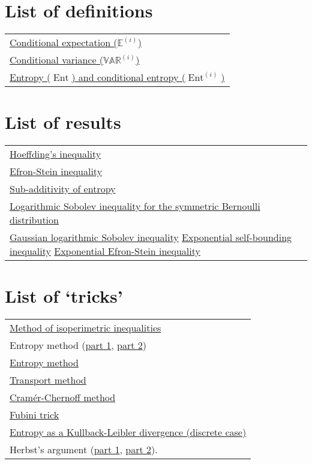 \documentclass[reqno]{amsproc}
\newcommand{\E}{\mathbb{E}} %
\newcommand{\var}{\mathbb{VAR}} %
\DeclareMathOperator{\Ent}{Ent} %
\begin{document}

\appendix
\newpage


\section*{List of definitions}
	\begin{tabular}{l}
		\hyperref[thm:ESI]{Conditional expectation ($\E^{(i)}$)}\\
		\hyperref[thm:ESI]{Conditional variance ($\var^{(i)}$)}\\
		\hyperref[thm:sub_add_entropy]{Entropy ($\Ent$) and conditional entropy ($\Ent^{(i)}$)}
	\end{tabular}
\section*{List of results}
	\begin{tabular}{l}
		\hyperref[thm:hoeffding]{Hoeffding's inequality}\\
		\hyperref[thm:ESI]{Efron-Stein inequality}\\
		\hyperref[thm:sub_add_entropy]{Sub-additivity of entropy}\\
		\hyperref[thm:log_Sob_ineq_sym_Bernoulli]{Logarithmic Sobolev inequality for the symmetric Bernoulli distribution}\\
		\hyperref[thm:Gaussian_log_Sob_ineq]{Gaussian logarithmic Sobolev inequality}
		\hyperref[thm:sub_add_entropy]{Exponential self-bounding inequality}
		\hyperref[thm:exp_efron_stein]{Exponential Efron-Stein inequality}
	\end{tabular}
\section*{List of `tricks'}
	\begin{tabular}{l}
		\hyperref[sec:method_of_isoperimetric_inequalities]{Method of isoperimetric inequalities}\\
		Entropy method (\hyperref[sec:entropy_method]{part 1}, \hyperref[rmk:entropy_method]{part 2})\\
		\hyperref[sec:entropy_method]{Entropy method}\\
		\hyperref[sec:transport_method]{Transport method}\\
		\hyperref[rmk:cramer_chernoff]{Cram\'{e}r-Chernoff method}\\
		\hyperref[rmk:Fubini]{Fubini trick}\\
		\hyperref[rmk:entropy_as_KL_divergence]{Entropy as a Kullback-Leibler divergence (discrete case)}\\
		Herbst's argument (\hyperref[rmk:herbst_1]{part 1}, \hyperref[rmk:herbst_2]{part 2}).
	\end{tabular}
\end{document}
